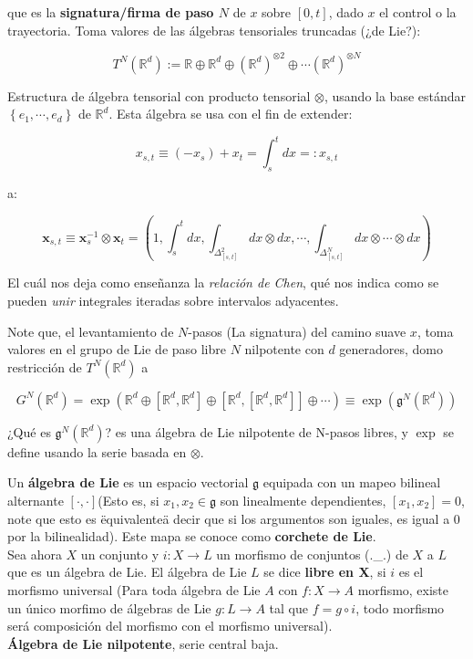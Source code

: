 que es la \textbf{signatura/firma de paso $N$} de $x$ sobre $[0,t]$, dado $x$ el control o la trayectoria. Toma valores de las álgebras tensoriales truncadas (¿de Lie?):

\[
	T^N (\mathbb{R}^d) := \mathbb{R} \oplus \mathbb{R}^d \oplus \left( \mathbb{R}^d \right)^{\otimes 2} \oplus \cdots (\mathbb{R}^d)^{\otimes N}
\]

Estructura de álgebra tensorial con producto tensorial $\otimes$, usando la base estándar $\left\{ e_1, \cdots, e_d \right\}$ de $\mathbb{R}^d$. Esta álgebra se usa con el fin de extender:

\[
	x_{s,t} \equiv (-x_s) + x_t = \int_s^t dx =: x_{s,t}
\]


a:

\[
	\mathbf{x}_{s,t} \equiv \mathbf{x}_s^{-1} \otimes \mathbf{x}_t = \left( 1, \int_s^t dx, \int_{ \Delta_{[s,t]}^2 } dx \otimes dx, \cdots, \int_{ \Delta_{[s,t]}^N } dx \otimes \cdots \otimes dx \right)
\]

El cuál nos deja como enseñanza la \textit{relación de Chen}, qué nos indica como se pueden \textit{unir} integrales iteradas sobre intervalos adyacentes. 

Note que, el levantamiento de $N$-pasos (La signatura) del camino suave $x$, toma valores en el grupo de Lie de paso libre $N$ nilpotente con $d$ generadores, domo restricción de $T^N (\mathbb{R}^d)$ a 

\[
	G^N (\mathbb{R}^d) = \exp \left( \mathbb{R}^d \oplus \left[ \mathbb{R}^d, \mathbb{R}^d \right] \oplus \left[ \mathbb{R}^d, \left[ \mathbb{R}^d, \mathbb{R}^d \right] \right] \oplus \cdots \right) \equiv \exp( \mathfrak{g}^N (\mathbb{R}^d) )
\]

¿Qué es $\mathfrak{g}^N (\mathbb{R}^d)$? es una álgebra de Lie nilpotente de N-pasos libres, y $\exp$ se define usando la serie basada en $\otimes$.

\begin{boxDef}
	Un \textbf{álgebra de Lie} es un espacio vectorial $\mathfrak{g}$ equipada con un mapeo bilineal alternante $[\cdot, \cdot] $(Esto es, si $x_1, x_2 \in \mathfrak{g}$ son linealmente dependientes, $[x_1, x_2] = 0$, note que esto es \"equivalente\" a decir que si los argumentos son iguales, es igual a 0 por la bilinealidad). Este mapa se conoce como \textbf{corchete de Lie}. \\

	Sea ahora $X$ un conjunto y $i: X \rightarrow L$ un morfismo de conjuntos (.\_.) de $X$ a $L$ que es un álgebra de Lie. El álgebra de Lie $L$ se dice \textbf{libre en X}, si $i$ es el morfismo universal (Para toda álgebra de Lie $A$ con $f: X \rightarrow A$ morfismo, existe un único morfimo de álgebras de Lie $g: L \rightarrow A$ tal que $f = g \circ i$, todo morfismo será composición del morfismo con el morfismo universal). \\

	\textbf{Álgebra de Lie nilpotente}, serie central baja.
\end{boxDef}


